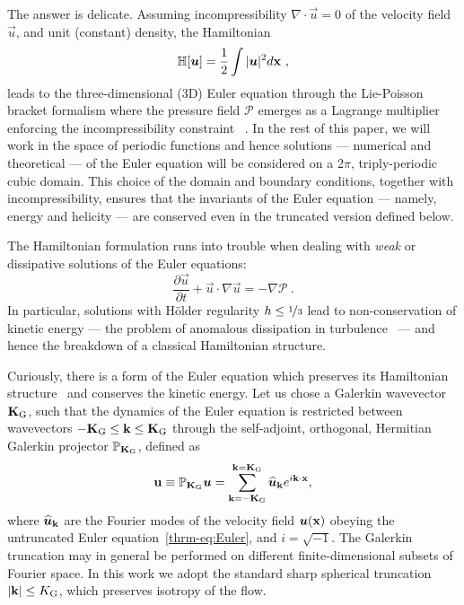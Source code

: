 \documentclass[../Rajarshi-thesis-draft.tex]{subfiles}
\begin{document}
The answer is delicate. Assuming incompressibility $\nabla\cdot\vec{u} = 0$ of
the  velocity field $\vec{u}$, and unit (constant) density, the Hamiltonian
\begin{equation}
\mathbb{H}[\vec{u}] = \frac{1}{2}\int |\vec{u}|^2 d{\bf x} \ ,
\end{equation}
leads to the three-dimensional (3D) Euler equation
through the Lie-Poisson bracket formalism where the pressure field $\mathcal{P}$ emerges as a Lagrange multiplier enforcing
the incompressibility constraint ~\cite{MorrisonRMP}.
In the rest of this paper, we will work in the space of periodic functions and {hence solutions --- numerical and theoretical --- of
the Euler equation will be considered on a 2$\pi$, triply-periodic cubic domain. This choice of the domain and boundary conditions,
together with incompressibility,
ensures that the invariants of the Euler equation --- namely, energy and helicity --- are conserved even in the truncated version
defined below.}

The Hamiltonian formulation runs into trouble when dealing with
\textit{weak} or dissipative solutions of the Euler equations:
\begin{equation}
\frac{\partial \vec{u}}{\partial t} + \vec{u}\cdot \nabla \vec{u} = -\nabla \mathcal{P} \ .
\label{thrm-eq:Euler}
\end{equation}
In particular, solutions with H\"older regularity {$h \le \nicefrac{1}{3}$} lead to non-conservation of
kinetic energy --- the problem of anomalous dissipation in turbulence~\cite{Eyink2024} --- and
hence the breakdown of a classical Hamiltonian structure.

Curiously, there is a form of the Euler equation which preserves its Hamiltonian structure~\cite{Lee1952} and conserves the kinetic energy. Let us chose a Galerkin wavevector ${\bf K}_{\rm G}$, such that the dynamics of the Euler
equation is restricted between wavevectors $-{\bf K}_{\rm G} \le {\bf k} \le {\bf K}_{\rm G}$ through
the self-adjoint, orthogonal, Hermitian Galerkin projector $\mathbb{P}_{{\bf K}_{\rm G}}$, defined as
{\begin{equation}
	{\bf u} \equiv \mathbb{P}_{{\bf K}_{\rm G}} \vec{u} = \sum_{{\bf k} = -{\bf K}_{\rm G}}^{{\bf k} = {\bf K}_{\rm G}} \hat{\vec{u}}_{\bf k} e^{i {\bf k}\cdot {\bf x}},
\label{thrm-eq:PG}
\end{equation}}
where $\hat{\vec{u}}_{\bf k}$ are the Fourier modes of the velocity field $\vec{u}({\bf x})$ obeying the untruncated Euler equation~\eqref{thrm-eq:Euler}, {and $i = \sqrt{-1}$}.
{The Galerkin truncation may in general be performed on different
finite-dimensional subsets of Fourier space. In this work we adopt the
standard sharp spherical truncation $|\mathbf{k}| \le K_{\rm G}$, which
preserves isotropy of the flow.}
\end{document}

